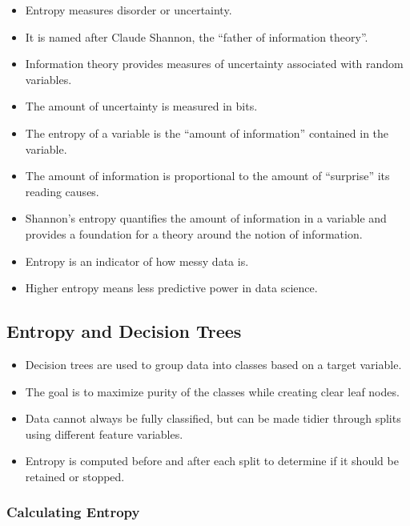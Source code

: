 \documentclass[11pt]{article}
\providecommand{\tightlist}{%
      \setlength{\itemsep}{0pt}\setlength{\parskip}{0pt}}
\begin{document}
\begin{itemize}
\tightlist
\item
  Entropy measures disorder or uncertainty.
\item
  It is named after Claude Shannon, the ``father of information
  theory''.
\item
  Information theory provides measures of uncertainty associated with
  random variables.
\item
  The amount of uncertainty is measured in bits.
\item
  The entropy of a variable is the ``amount of information'' contained
  in the variable.
\item
  The amount of information is proportional to the amount of
  ``surprise'' its reading causes.
\item
  Shannon's entropy quantifies the amount of information in a variable
  and provides a foundation for a theory around the notion of
  information.
\item
  Entropy is an indicator of how messy data is.
\item
  Higher entropy means less predictive power in data science.
\end{itemize}

\hypertarget{entropy-and-decision-trees}{%
\subsection{Entropy and Decision
Trees}\label{entropy-and-decision-trees}}

\begin{itemize}
\tightlist
\item
  Decision trees are used to group data into classes based on a target
  variable.
\item
  The goal is to maximize purity of the classes while creating clear
  leaf nodes.
\item
  Data cannot always be fully classified, but can be made tidier through
  splits using different feature variables.
\item
  Entropy is computed before and after each split to determine if it
  should be retained or stopped.
\end{itemize}

\hypertarget{calculating-entropy}{%
\subsubsection{Calculating Entropy}\label{calculating-entropy}}
\end{document}
